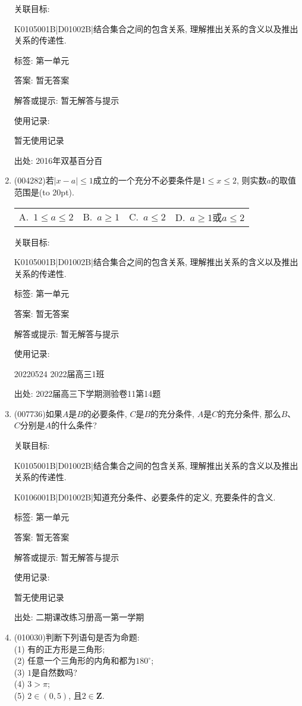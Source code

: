 \documentclass[10pt,a4paper]{article}
\newcommand{\bracket}[1]{(\hbox to #1pt{})}
\newcommand{\fourch}[4]{\par\begin{tabular}{p{.23\textwidth}p{.23\textwidth}p{.23\textwidth}p{.23\textwidth}}
A.~#1 &B.~#2& C.~#3& D.~#4
\end{tabular}}
\begin{document}
\begin{enumerate}[1.]
关联目标:

K0105001B|D01002B|结合集合之间的包含关系, 理解推出关系的含义以及推出关系的传递性.



标签: 第一单元

答案: 暂无答案

解答或提示: 暂无解答与提示

使用记录:

暂无使用记录


出处: 2016年双基百分百
\item { (004282)}若$|x-a|\le 1$成立的一个充分不必要条件是$1\le x\le 2$, 则实数$a$的取值范围是\bracket{20}.
\fourch{$1\le a\le 2$}{$a\ge 1$}{$a\le 2$}{$a\ge 1$或$a\le 2$}


关联目标:

K0105001B|D01002B|结合集合之间的包含关系, 理解推出关系的含义以及推出关系的传递性.



标签: 第一单元

答案: 暂无答案

解答或提示: 暂无解答与提示

使用记录:

20220524	2022届高三1班	


出处: 2022届高三下学期测验卷11第14题
\item { (007736)}如果$A$是$B$的必要条件, $C$是$B$的充分条件, $A$是$C$的充分条件, 那么$B$、$C$分别是$A$的什么条件?


关联目标:

K0105001B|D01002B|结合集合之间的包含关系, 理解推出关系的含义以及推出关系的传递性.

K0106001B|D01002B|知道充分条件、必要条件的定义, 充要条件的含义.



标签: 第一单元

答案: 暂无答案

解答或提示: 暂无解答与提示

使用记录:

暂无使用记录


出处: 二期课改练习册高一第一学期
\item { (010030)}判断下列语句是否为命题:\\
(1) 有的正方形是三角形;\\
(2) 任意一个三角形的内角和都为$180^\circ$;\\
(3) $1$是自然数吗?\\
(4) $3>\pi$;\\
(5) $2\in (0, 5)$, 且$2\in \mathbf{Z}$.



\end{enumerate}
\end{document}
